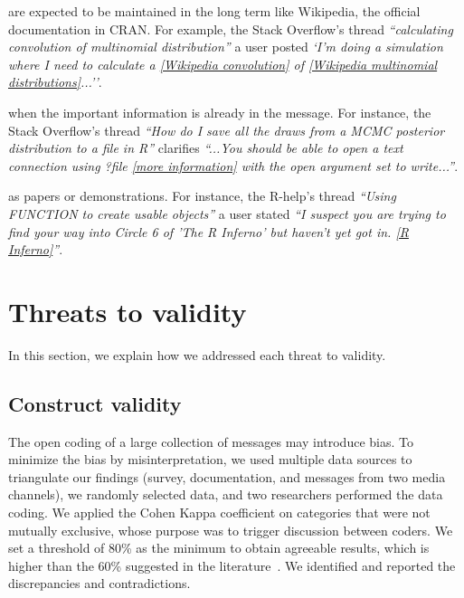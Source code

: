     \begin{description}[itemsep=3pt, topsep=2pt, leftmargin=3em, parsep=0pt]
        \item[Well known websites] are expected to be maintained in the long term like Wikipedia, the official documentation in CRAN.
        For example, the Stack Overflow's thread \textit{``calculating convolution of multinomial distribution''} a user posted \textit{`I'm doing a simulation where I need to calculate a \href{https://en.wikipedia.org/wiki/Convolution_of_probability_distributions}{[Wikipedia convolution]} of \href{https://en.wikipedia.org/wiki/Multinomial_distribution}{[Wikipedia multinomial distributions]}...''}.

        \item[Resources that support or expand the message] when the important information is already in the message.
        For instance, the Stack Overflow's thread \textit{``How do I save all the draws from a MCMC posterior distribution to a file in R''} clarifies \textit{``...You should be able to open a text connection using ?file \href{http://stat.ethz.ch/R-manual/R-devel/library/base/html/connections.html}{[more information]} with the open argument set to write...''}.

        \item[Material relevant to the message is too big] as papers or demonstrations.
        For instance, the R-help's thread \textit{``Using FUNCTION to create usable objects''} a user stated \textit{``I suspect you are trying to find your way into Circle 6 of 'The R Inferno' but haven't yet got in. \href{http://www.burns-stat.com/pages/Tutor/R\_inferno.pdf}{[R Inferno]}''}.
    \end{description}

\section{Threats to validity}
\label{cha:threats}

    In this section, we explain how we addressed each threat to
    validity.

\subsection{Construct validity}

    The open coding of a large collection of messages may introduce bias.
    To minimize the bias by misinterpretation, we used multiple data sources to triangulate our findings (survey, documentation, and messages from two media channels), we randomly selected data, and two researchers performed the data coding.
    We applied the Cohen Kappa coefficient on categories that were not mutually exclusive, whose purpose  was to trigger discussion between coders.
    We set a threshold of 80\% as the minimum to obtain agreeable results, which is higher than the 60\% suggested in the literature~\cite{Landis1977}.
    We identified and reported the discrepancies and contradictions.

